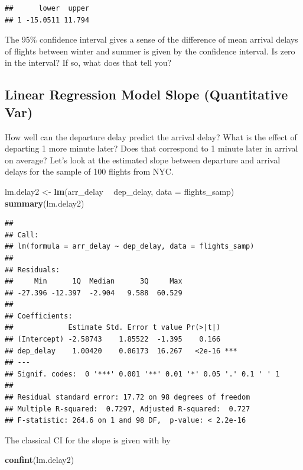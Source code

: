 \documentclass[]{book}
\newenvironment{Shaded}{\begin{snugshade}}{\end{snugshade}}
\newcommand{\DataTypeTok}[1]{\textcolor[rgb]{0.13,0.29,0.53}{#1}}
\newcommand{\KeywordTok}[1]{\textcolor[rgb]{0.13,0.29,0.53}{\textbf{#1}}}
\newcommand{\NormalTok}[1]{#1}
\newcommand{\OperatorTok}[1]{\textcolor[rgb]{0.81,0.36,0.00}{\textbf{#1}}}
\newcommand{\StringTok}[1]{\textcolor[rgb]{0.31,0.60,0.02}{#1}}
\begin{document}
\begin{verbatim}
##      lower  upper
## 1 -15.0511 11.794
\end{verbatim}

The 95\% confidence interval gives a sense of the difference of mean arrival delays of flights between winter and summer is given by the confidence interval. Is zero in the interval? If so, what does that tell you?

\hypertarget{linear-regression-model-slope-quantitative-var}{%
\subsection{Linear Regression Model Slope (Quantitative Var)}\label{linear-regression-model-slope-quantitative-var}}

How well can the departure delay predict the arrival delay? What is the effect of departing 1 more minute later? Does that correspond to 1 minute later in arrival on average? Let's look at the estimated slope between departure and arrival delays for the sample of 100 flights from NYC.

\begin{Shaded}
\begin{Highlighting}[]
\NormalTok{lm.delay2 <-}\StringTok{ }\KeywordTok{lm}\NormalTok{(arr_delay }\OperatorTok{~}\StringTok{ }\NormalTok{dep_delay, }\DataTypeTok{data =}\NormalTok{ flights_samp)}
\KeywordTok{summary}\NormalTok{(lm.delay2)}
\end{Highlighting}
\end{Shaded}

\begin{verbatim}
## 
## Call:
## lm(formula = arr_delay ~ dep_delay, data = flights_samp)
## 
## Residuals:
##     Min      1Q  Median      3Q     Max 
## -27.396 -12.397  -2.904   9.588  60.529 
## 
## Coefficients:
##             Estimate Std. Error t value Pr(>|t|)    
## (Intercept) -2.58743    1.85522  -1.395    0.166    
## dep_delay    1.00420    0.06173  16.267   <2e-16 ***
## ---
## Signif. codes:  0 '***' 0.001 '**' 0.01 '*' 0.05 '.' 0.1 ' ' 1
## 
## Residual standard error: 17.72 on 98 degrees of freedom
## Multiple R-squared:  0.7297, Adjusted R-squared:  0.727 
## F-statistic: 264.6 on 1 and 98 DF,  p-value: < 2.2e-16
\end{verbatim}

The classical CI for the slope is given with by

\begin{Shaded}
\begin{Highlighting}[]
\KeywordTok{confint}\NormalTok{(lm.delay2)}
\end{Highlighting}
\end{Shaded}
\end{document}
